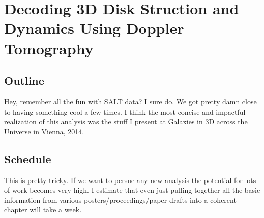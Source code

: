 \chapter[Doppler Tomography]{Decoding 3D Disk Struction and Dynamics Using Doppler Tomography}
\label{chap:SALT}



\section{Outline}
Hey, remember all the fun with SALT data? I sure do. We got pretty damn close
to having something cool a few times. I think the most concise and impactful
realization of this analysis was the stuff I present at Galaxies in 3D across
the Universe in Vienna, 2014.

\section{Schedule}
This is pretty tricky. If we want to persue any new analysis the potential for
lots of work becomes very high. I estimate that even just pulling together all
the basic information from various posters/proceedings/paper drafts into a
coherent chapter will take a week.



